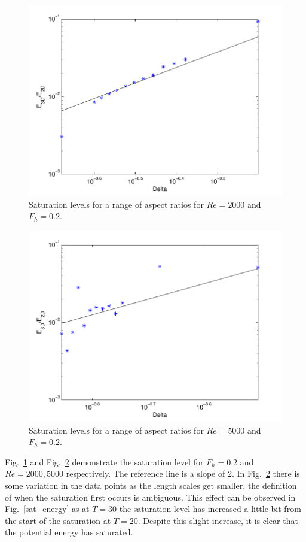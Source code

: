 \begin{figure}
\begin{center}
\includegraphics[width=\textwidth]{re2000_fh02_saturations} 
\caption{Saturation levels for a range of aspect ratios for $Re=2000$ and $F_{h}=0.2$.}
\label{re2000sat}
\end{center}
\end{figure}
\begin{figure}
\begin{center}
\includegraphics[width=\textwidth]{re5000_fh02_saturations} 
\caption{Saturation levels for a range of aspect ratios for $Re=5000$ and $F_{h}=0.2$. }
\label{re5000sat}
\end{center}
\end{figure}
Fig.~\ref{re2000sat} and Fig.~\ref{re5000sat} demonstrate the saturation level for $F_{h}=0.2$ and $Re=2000,5000$ respectively. The reference line is a slope of 2. In Fig.~\ref{re5000sat} there is some variation in the data points as the length scales get smaller, the definition of when the saturation first occurs is ambiguous. This effect can be observed in Fig.~\ref{sat_energy} as at $T=30$ the saturation level has increased a little bit from the start of the saturation at $T=20$. Despite this slight increase, it is clear that the potential energy has saturated. 

